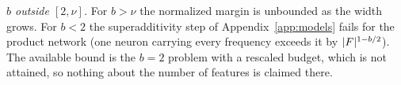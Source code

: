 \emph{$b$ outside $[2,\nu]$.} For $b>\nu$ the normalized margin is unbounded as the width grows. For $b<2$ the superadditivity step of Appendix~\ref{app:models} fails for the product network (one neuron carrying every frequency exceeds it by $|F|^{1-b/2}$). The available bound is the $b=2$ problem with a rescaled budget, which is not attained, so nothing about the number of features is claimed there.
